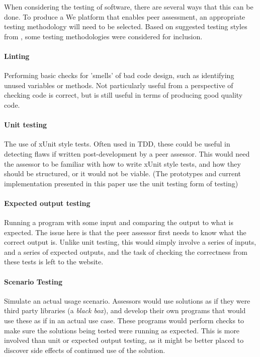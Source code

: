 \documentclass[sigplan,10pt,review]{acmart}\settopmatter{printfolios=true}
\begin{document}

When considering the testing of software, there are several ways that
this can be done. To produce a We platform that enables peer assessment,
an appropriate testing methodology will need to be selected. Based on
suggested testing styles from  \citet{laboon_friendly_2016},
some testing methodologies were considered for inclusion.

\paragraph{Linting} Performing basic checks for 'smells' of bad code
  design, such as identifying unused variables or methods. Not
  particularly useful from a perspective of checking code is correct,
  but is still useful in terms of producing good quality code.
\paragraph{Unit testing} The use of xUnit style tests. Often used in
  \ac{TDD}, these could be useful in detecting flaws if
  written post-development by a peer assessor. This would need the
  assessor to be familiar with how to write xUnit style tests, and how
  they should be structured, or it would not be viable. (The
  prototypes and current implementation presented in this paper use
  the unit testing form of testing)
\paragraph{Expected output testing} Running a program with some input and
  comparing the output to what is expected. The issue here is that the
  peer assessor first needs to know what the correct output is. Unlike
  unit testing, this would simply involve a series of inputs, and a
  series of expected outputs, and the task of checking the correctness
  from these tests is left to the website.
\paragraph{Scenario Testing} Simulate an actual usage scenario. Assessors
  would use solutions as if they were third party libraries (a
  \emph{black box}), and develop their own programs that would use
  these as if in an actual use case. These programs would perform
  checks to make sure the solutions being tested were running as
  expected. This is more involved than unit or expected output
  testing, as it might be better placed to discover side effects of
  continued use of the solution.
\end{document}

